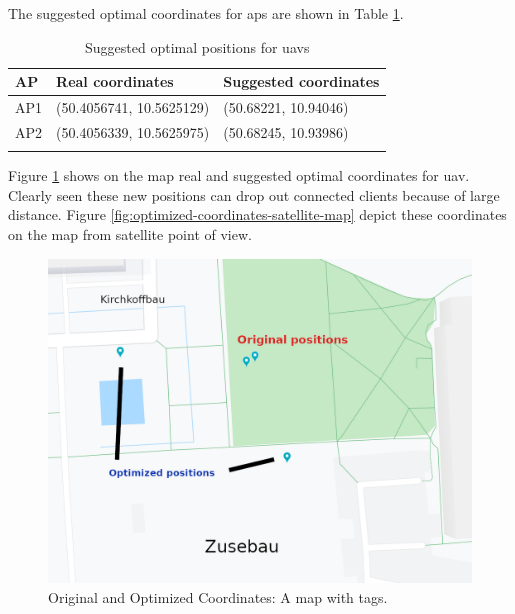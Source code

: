 The suggested optimal coordinates for \glspl{ap} are shown in Table \ref{tab:optimal-coordinates}.

\begin{longtable}[]{@{}lll@{}}
\caption{Suggested optimal positions for \glspl{uav} }\tabularnewline
\toprule
AP & Real coordinates & Suggested coordinates\tabularnewline
\midrule
\endhead
AP1 & (50.4056741, 10.5625129) & (50.68221, 10.94046)\tabularnewline
AP2 & (50.4056339, 10.5625975) & (50.68245, 10.93986)\tabularnewline
\bottomrule
\label{tab:optimal-coordinates}
\end{longtable}

Figure \ref{fig:optimized-coordinates-on-logical-map} shows on the map real and suggested optimal coordinates for \gls{uav}. Clearly seen these new positions can drop out connected clients because of large distance. Figure \ref{fig:optimized-coordinates-satellite-map} depict these coordinates on the map from satellite point of view.

\begin{figure}[H]
	\centering
	\includegraphics[width=\linewidth,keepaspectratio]{images/Expt4_Result_of_optimization_map_with_names.png}
\caption{Original and Optimized Coordinates: A map with tags.}
\label{fig:optimized-coordinates-on-logical-map}
\end{figure}

